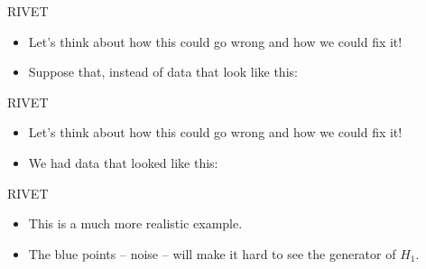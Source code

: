\begin{frame}{RIVET}
\begin{itemize}
\item<1-> Let's think about how this could go wrong and how we could fix it!
\item<2-> Suppose that, instead of data that look like this:
\begin{figure}
\end{figure} 
\end{itemize}
\end{frame}
\begin{frame}{RIVET}
\begin{itemize}
\item Let's think about how this could go wrong and how we could fix it!
\item We had data that looked like this:
\begin{figure}
\end{figure} 
\end{itemize}
\end{frame}
\begin{frame}{RIVET}
\begin{itemize}
\item<1-> This is a much more realistic example.
\item<2-> The blue points -- noise -- will make it hard to see the generator of $H_1$.
\begin{figure}
\end{figure} 
\end{itemize}
\end{frame}
